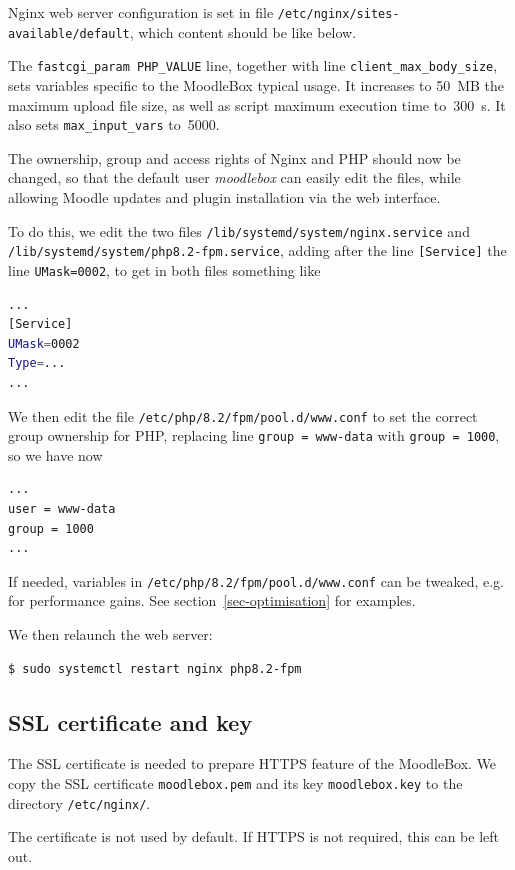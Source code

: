 \documentclass[12pt]{article}
\begin{document}
Nginx web server configuration is set in file \lstinline{/etc/nginx/sites-available/default}, which content should be like below.


The \lstinline{fastcgi_param PHP_VALUE} line, together with line \lstinline{client_max_body_size}, sets variables specific to the MoodleBox typical usage.
It increases to 50~MB the maximum upload file size, as well as script maximum execution time to~300~s.
It also sets \lstinline{max_input_vars} to~5000.

The ownership, group and access rights of Nginx and PHP should now be changed, so that the default user \emph{moodlebox} can easily edit the files, while allowing Moodle updates and plugin installation via the web interface.

To do this, we edit the two files \lstinline{/lib/systemd/system/nginx.service} and \lstinline{/lib/systemd/system/php8.2-fpm.service}, adding after the line \lstinline{[Service]} the line \lstinline{UMask=0002}, to get in both files something like
\begin{lstlisting}[language=bash]
...
[Service]
UMask=0002
Type=...
...
\end{lstlisting}
We then edit the file \lstinline{/etc/php/8.2/fpm/pool.d/www.conf} to set the correct group ownership for PHP, replacing line \lstinline{group = www-data} with \lstinline{group = 1000}, so we have now
\begin{lstlisting}[language=bash]
...
user = www-data
group = 1000
...
\end{lstlisting}
If needed, variables in \lstinline{/etc/php/8.2/fpm/pool.d/www.conf} can be tweaked, e.g. for performance gains. See section~\ref{sec-optimisation} for examples.

We then relaunch the web server:
\begin{lstlisting}[language=bash]
$ sudo systemctl restart nginx php8.2-fpm
\end{lstlisting}

\subsection{SSL certificate and key}

The SSL certificate is needed to prepare HTTPS feature of the MoodleBox.
We copy the SSL certificate \lstinline{moodlebox.pem} and its key \lstinline{moodlebox.key} to the directory \lstinline{/etc/nginx/}.

The certificate is not used by default.
If HTTPS is not required, this can be left out.
\end{document}
